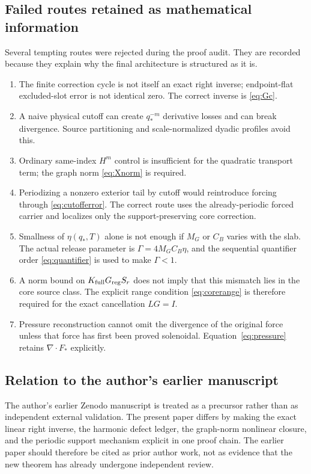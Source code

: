 \documentclass[11pt]{article}
\numberwithin{equation}{section}
\begin{document}
\subsection{Failed routes retained as mathematical information}
Several tempting routes were rejected during the proof audit.  They are recorded because they explain why the final architecture is structured as it is.
\begin{enumerate}[label=(F\arabic*)]
\item The finite correction cycle is not itself an exact right inverse; endpoint-flat excluded-slot error is not identical zero.  The correct inverse is \eqref{eq:Gc}.
\item A naive physical cutoff can create \(q_*^{-m}\) derivative losses and can break divergence.  Source partitioning and scale-normalized dyadic profiles avoid this.
\item Ordinary same-index \(H^m\) control is insufficient for the quadratic transport term; the graph norm \eqref{eq:Xnorm} is required.
\item Periodizing a nonzero exterior tail by cutoff would reintroduce forcing through \eqref{eq:cutofferror}.  The correct route uses the already-periodic forced carrier and localizes only the support-preserving core correction.
\item Smallness of \(\eta(q_*,T)\) alone is not enough if \(M_G\) or \(C_B\) varies with the slab.  The actual release parameter is \(\Gamma=4M_GC_B\eta\), and the sequential quantifier order \eqref{eq:quantifier} is used to make \(\Gamma<1\).
\item A norm bound on \(K_{\rm full}G_{\rm reg}S_r\) does not imply that this mismatch lies in the core source class.  The explicit range condition \eqref{eq:corerange} is therefore required for the exact cancellation \(LG=I\).
\item Pressure reconstruction cannot omit the divergence of the original force unless that force has first been proved solenoidal.  Equation~\eqref{eq:pressure} retains \(\nabla\!\cdot F_*\) explicitly.
\end{enumerate}

\subsection{Relation to the author's earlier manuscript}
The author's earlier Zenodo manuscript \cite{NewtonZenodo22857336} is treated as a precursor rather than as independent external validation.  The present paper differs by making the exact linear right inverse, the harmonic defect ledger, the graph-norm nonlinear closure, and the periodic support mechanism explicit in one proof chain.  The earlier paper should therefore be cited as prior author work, not as evidence that the new theorem has already undergone independent review.
\end{document}
